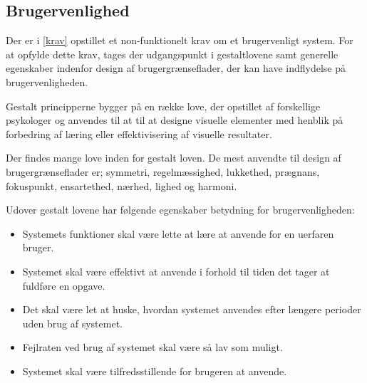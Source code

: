 \subsection{Brugervenlighed}
Der er i \autoref{krav} opstillet et non-funktionelt krav om et brugervenligt system. For at opfylde dette krav, tages der udgangspunkt i gestaltlovene samt generelle egenskaber indenfor design af brugergrænseflader, der kan have indflydelse på brugervenligheden. 

Gestalt principperne bygger på en række love, der opstillet af forskellige psykologer og anvendes til at til at designe visuelle elementer med henblik på forbedring af læring eller effektivisering af visuelle resultater. 

Der findes mange love inden for gestalt loven. De mest anvendte til design af brugergrænseflader er; symmetri, regelmæssighed, lukkethed, prægnans, fokuspunkt, ensartethed, nærhed, lighed og harmoni. 

Udover gestalt lovene har følgende egenskaber betydning for brugervenligheden:
\begin{itemize}
\item Systemets funktioner skal være lette at lære at anvende for en uerfaren bruger.
\item Systemet skal være effektivt at anvende i forhold til tiden det tager at fuldføre en opgave.
\item Det skal være let at huske, hvordan systemet anvendes efter længere perioder uden brug af systemet.
\item Fejlraten ved brug af systemet skal være så lav som muligt.
\item Systemet skal være tilfredsstillende for brugeren at anvende. 
\end{itemize}
 
 
